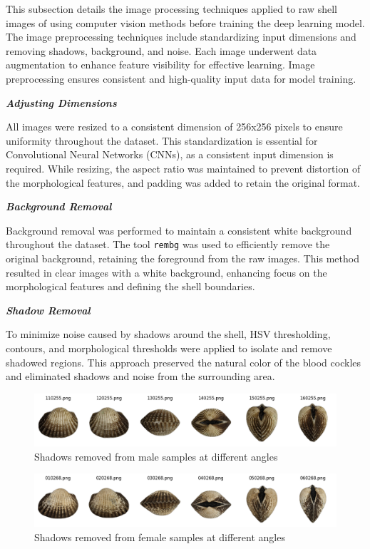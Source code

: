 This subsection details the image processing techniques applied to raw shell images of \Tgranosa using computer vision methods before training the deep learning model. The image preprocessing techniques include standardizing input dimensions and removing shadows, background, and noise. Each image underwent data augmentation to enhance feature visibility for effective learning. Image preprocessing ensures consistent and high-quality input data for model training.

\textbf{\textit{Adjusting Dimensions}}

All images were resized to a consistent dimension of 256x256 pixels to ensure uniformity throughout the dataset. This standardization is essential for Convolutional Neural Networks (CNNs), as a consistent input dimension is required. While resizing, the aspect ratio was maintained to prevent distortion of the morphological features, and padding was added to retain the original format.

\textbf{\textit{Background Removal}}

Background removal was performed to maintain a consistent white background throughout the dataset. The tool \texttt{rembg} was used to efficiently remove the original background, retaining the foreground from the raw images. This method resulted in clear images with a white background, enhancing focus on the morphological features and defining the shell boundaries.

\textbf{\textit{Shadow Removal}}

To minimize noise caused by shadows around the shell, HSV thresholding, contours, and morphological thresholds were applied to isolate and remove shadowed regions. This approach preserved the natural color of the blood cockles and eliminated shadows and noise from the surrounding area.

\begin{figure}[h]
	\centering
	\includegraphics[width=\textwidth]{figures/male_shadows_removed.png}
	\caption{Shadows removed from male samples at different angles}
\end{figure}

\begin{figure}[h]
	\centering
	\includegraphics[width=\textwidth]{figures/female_shadows_removed.png}
	\caption{Shadows removed from female samples at different angles}
\end{figure}

